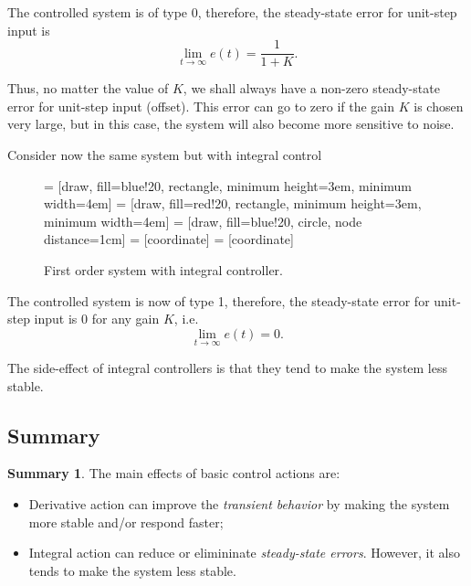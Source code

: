 \documentclass[a4paper,11pt]{report}
\theoremstyle{definition}
\newtheorem{mdsummary}{Summary}
\newenvironment{summary}%
  {\vspace{0.1cm}\begin{mdframed}[linecolor=red!60!black,
  linewidth=2pt]\begin{mdsummary}}%
  {\end{mdsummary}\end{mdframed}\vspace{0.1cm}}
\begin{document}
The controlled system is of type 0, therefore, the steady-state error
for unit-step input is
\[
\lim_{t\to\infty}e(t) = \frac{1}{1+K}. 
\]

Thus, no matter the value of $K$, we shall always have a non-zero
steady-state error for unit-step input (offset). This error can go to
zero if the gain $K$ is chosen very large, but in this case, the
system will also become more sensitive to noise.

Consider now the same system but with integral control
\begin{figure}[H]
  \label{fig:integral}
  \centering
   = [draw, fill=blue!20, rectangle, minimum height=3em, minimum width=4em]
   = [draw, fill=red!20, rectangle, minimum height=3em, minimum width=4em]
   = [draw, fill=blue!20, circle, node distance=1cm]
   = [coordinate]
   = [coordinate]
  \caption{First order system with integral controller.}
\end{figure}

The controlled system is now of type 1, therefore, the steady-state error for
unit-step input is 0 for any gain $K$, i.e.
\[
\lim_{t\to\infty}e(t) = 0. 
\]

The side-effect of integral controllers is that they tend to make the
system less stable.

\subsection{Summary}

\begin{summary}
  The main effects of basic control actions are:
  \begin{itemize}
  \item Derivative action can improve the \emph{transient behavior}
    by making the system more stable and/or respond faster;
  \item Integral action can reduce or elimininate \emph{steady-state
      errors}. However, it also tends to make the system less stable.
  \end{itemize}
\end{summary}
\end{document}
